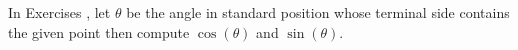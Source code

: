 {\noindent In Exercises}
{, let $\theta$ be the angle in standard position whose terminal side contains the given point then compute $\cos(\theta)$ and $\sin(\theta)$.}
